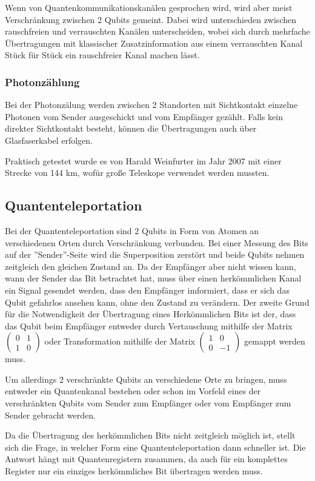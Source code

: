 Wenn von Quantenkommunikationskanälen gesprochen wird, wird aber meist Verschränkung zwischen 2 Qubits gemeint. Dabei wird unterschieden zwischen rauschfreien und verrauschten Kanälen unterscheiden, wobei sich durch mehrfache Übertragungen mit klassischer Zusatzinformation aus einem verrauschten Kanal Stück für Stück ein rauschfreier Kanal machen lässt.


\subsubsection{Photonzählung}
\label{sec:Photonzaehlung}

Bei der Photonzälung werden zwischen 2 Standorten mit Sichtkontakt einzelne Photonen vom Sender ausgeschickt und vom Empfänger gezählt. Falls kein direkter Sichtkontakt besteht, können die Übertragungen auch über Glasfaserkabel erfolgen.

Praktisch getestet wurde es von Harald Weinfurter im Jahr 2007 mit einer Strecke von 144 km, wofür große Teleskope verwendet werden mussten.


\subsection{Quantenteleportation}
\label{sec:Quantenteleportation}

Bei der Quantenteleportation sind 2 Qubits in Form von Atomen an verschiedenen Orten durch Verschränkung verbunden. Bei einer Messung des Bits auf der ''Sender''-Seite wird die Superposition zerstört und beide Qubits nehmen zeitgleich den gleichen Zustand an. Da der Empfänger aber nicht wissen kann, wann der Sender das Bit betrachtet hat, muss über einen herkömmlichen Kanal ein Signal gesendet werden, dass den Empfänger imformiert, dass er sich das Qubit gefahrlos ansehen kann, ohne den Zustand zu verändern. Der zweite Grund für die Notwendigkeit der Übertragung eines Herkömmlichen Bits ist der, dass das Qubit beim Empfänger entweder durch Vertauschung mithilfe der Matrix $\begin{pmatrix} 
    0 & 1 \\
    1 & 0
\end{pmatrix}$ oder Transformation mithilfe der Matrix $\begin{pmatrix} 
    1 & 0 \\
    0 & -1
\end{pmatrix}$ gemappt werden muss.

Um allerdings 2 verschränkte Qubits an verschiedene Orte zu bringen, muss entweder ein Quantenkanal bestehen oder schon im Vorfeld eines der verschränkten Qubits vom Sender zum Empfänger oder vom Empfänger zum Sender gebracht werden.

Da die Übertragung des herkömmlichen Bits nicht zeitgleich möglich ist, stellt sich die Frage, in welcher Form eine Quantenteleportation dann schneller ist. Die Antwort hängt mit Quantenregistern zusammen, da auch für ein komplettes Register nur ein einziges herkömmliches Bit übertragen werden muss.

